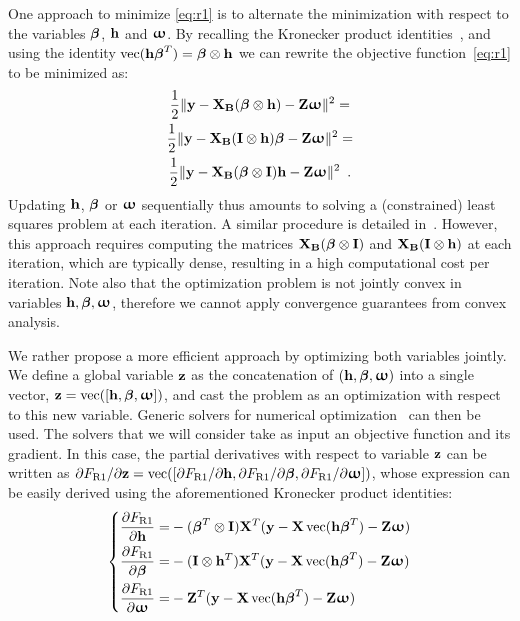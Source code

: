 One approach to minimize \eqref{eq:r1} is to alternate the minimization
with respect to the variables ${\boldsymbol \beta}$, $\mathbf{h}$ and ${\boldsymbol \upomega}$. By recalling the Kronecker product identities~\cite[Chapter 4.3]{horn1991topics}, and using the identity \(\operatorname*{vec}(\mathbf{h}{\boldsymbol \beta}^T) = {\boldsymbol \beta}\otimes \mathbf{h}\)
we can rewrite the objective function~\eqref{eq:r1} to be minimized as:
%
\begin{gather}
\label{eq:kron}
\frac{1}{2}\|\B{y} - \B{X}_{\B{B}} (\bfbeta \otimes \B{h}) - \B{Z} \bfomega\| ^2 = \\ \frac{1}{2}\|\B{y} - \B{X}_{\B{B}} (\B{I} \otimes \B{h}) \bfbeta - \B{Z} \bfomega\| ^2 = \\ \frac{1}{2}\|\B{y} - \B{X}_{\B{B}} (\bfbeta \otimes \B{I}) \B{h} - \B{Z} \bfomega\|^2 \enspace.
\end{gather}
%
Updating $\mathbf{h}$, ${\boldsymbol \beta}$ or ${\boldsymbol \upomega}$ sequentially thus amounts to solving a (constrained) least squares
problem at each iteration. A similar procedure is detailed in~\citep{Degras2014}. However, this approach requires computing the
matrices $\mathbf{X}_{\mathbf{B}} ({\boldsymbol \beta} \otimes \mathbf{I})$ and $\mathbf{X}_{\mathbf{B}} (\mathbf{I} \otimes \mathbf{h})$ at each iteration, which are typically dense,
resulting in a high computational cost per iteration. Note also that the optimization problem is not jointly convex in variables $\mathbf{h}, {\boldsymbol \beta}, {\boldsymbol \upomega}$, therefore we cannot apply convergence guarantees from convex analysis.

We rather propose a more efficient approach by optimizing both variables jointly. We define a 
global variable $\mathbf{z}$ as the concatenation of $(\mathbf{h}, {\boldsymbol \beta}, {\boldsymbol \upomega})$ into a single vector, $\mathbf{z} = \operatorname*{vec}([\mathbf{h}, {\boldsymbol \beta}, {\boldsymbol \upomega}])$,
 and cast the problem as an optimization with respect to this new variable.
Generic solvers for numerical
optimization~\citep{nocedal2006numerical} can then be used. The solvers that we will consider take as
input an objective function and its gradient. In this case, the partial derivatives with respect to variable $\mathbf{z}$ can be written as 
$\partial F_{\text{R1}} / \partial \mathbf{z} = \operatorname*{vec}([\partial F_{\text{R1}} / \partial \mathbf{h}, \partial F_{\text{R1}} / \partial{{\boldsymbol \beta}}, \partial F_{\text{R1}} / \partial {{\boldsymbol \upomega}}])$, whose expression can be
easily derived using the aforementioned Kronecker product identities:
%
\begin{equation*}
    \left\{
    \begin{aligned}
        \frac{\partial F_{\text{R1}}}{\partial \mathbf{h}}=& - ({\boldsymbol \beta}^T \otimes \mathbf{I}) \mathbf{X}^T (\mathbf{y} - \mathbf{X} \operatorname*{vec}(\mathbf{h} {\boldsymbol \beta}^T) - \mathbf{Z} {\boldsymbol \upomega}) \\
        \frac{\partial F_{\text{R1}}}{\partial {\boldsymbol \beta}}=& - (\mathbf{I} \otimes \mathbf{h}^T) \mathbf{X}^T (\mathbf{y} - \mathbf{X} \operatorname*{vec}(\mathbf{h} {\boldsymbol \beta}^T) - \mathbf{Z} {\boldsymbol \upomega}) \\
        \frac{\partial F_{\text{R1}}}{\partial {\boldsymbol \upomega}}=& - \mathbf{Z}^T (\mathbf{y} - \mathbf{X} \operatorname*{vec}(\mathbf{h} {\boldsymbol \beta}^T) - \mathbf{Z} {\boldsymbol \upomega})
    \end{aligned}
    \right.
\end{equation*}



